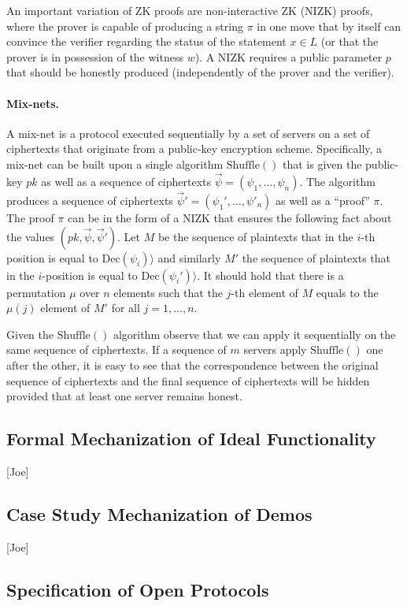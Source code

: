 An important variation of ZK proofs are non-interactive ZK (NIZK)
proofs, where the prover is capable of producing a string $\pi$ in one
move that by itself can convince the verifier regarding the status of
the statement $x\in L$ (or that the prover is in possession of the
witness $w$). A NIZK requires a public parameter $p$ that should be
honestly produced (independently of the prover and the verifier).

\paragraph{Mix-nets.} A mix-net is a protocol executed sequentially by
a set of servers on a set of ciphertexts that originate from a
public-key encryption scheme.  Specifically, a mix-net can be built
upon a single algorithm $\mathrm{Shuffle}()$ that is given the
public-key $pk$ as well as a sequence of ciphertexts
$\vec\psi = (\psi_1,\ldots, \psi_n)$.  The algorithm produces a
sequence of ciphertexts $\vec\psi' = (\psi_1', \ldots, \psi'_n)$ as
well as a ``proof'' $\pi$. The proof $\pi$ can be in the form of a
NIZK that ensures the following fact about the values
$(pk, \vec \psi, \vec \psi')$. Let $M$ be the sequence of plaintexts
that in the $i$-th position is equal to
$ \mathrm{Dec}(\psi_i) \rangle$ and similarly $M'$ the sequence of
plaintexts that in the $i$-position is equal to
$\mathrm{Dec}(\psi_i') \rangle$.  It should hold that there is a
permutation $\mu$ over $n$ elements such that the $j$-th element of
$M$ equals to the $\mu(j)$ element of $M'$ for all $j=1,\ldots, n$.

Given the $\mathrm{Shuffle}()$ algorithm observe that we can apply it
sequentially on the same sequence of ciphertexts. If a sequence of $m$
servers apply $\mathrm{Shuffle}()$ one after the other, it is easy to
see that the correspondence between the original sequence of
ciphertexts and the final sequence of ciphertexts will be hidden
provided that at least one server remains honest.

\subsection{Formal Mechanization of Ideal Functionality}
[Joe]

\subsection{Case Study Mechanization of Demos} 
[Joe]

\subsection{Specification of Open Protocols} 

